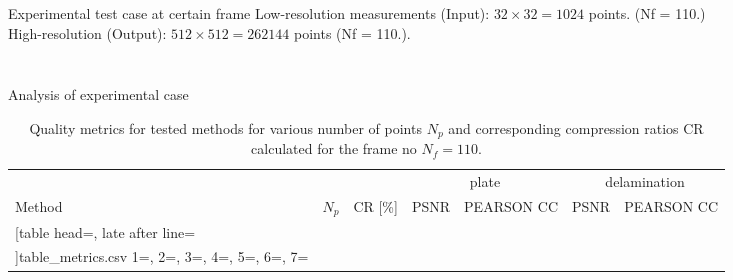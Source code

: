 \documentclass[10pt,aspectratio=169,dvipsnames]{beamer} %
\begin{document}
	\begin{frame}{Experimental test case at certain frame}
		Low-resolution measurements (Input): \(32\times32=1024\) points. (Nf = 110.)\\
		High-resolution (Output): \(512\times512=262144\) points (Nf = 110.).
		\begin{columns}[T]
			\begin{column}[c]{0.19\textwidth}
				\begin{figure}						
				\end{figure}
			\end{column}
			\begin{column}[c]{0.8\textwidth}
				\begin{figure}[ht!]
					\quad
					\quad
					\quad
					\quad
					\quad
					
					\quad
					\quad
					\quad
					\quad
					\quad
				\end{figure}
			\end{column}				
		\end{columns}
	\end{frame}
	\begin{frame}{Analysis of experimental case}
		\begin{table}[!ht]
			\renewcommand{\arraystretch}{1.3}
			\centering \footnotesize
			\caption{Quality metrics for tested methods for various number of points $N_p$ and corresponding compression ratios CR calculated for the frame no $N_f=110$.}	
			\begin{tabular}{lrrrcrc} 
				\toprule[1.5pt]
				& & & \multicolumn{2}{c}{plate} & \multicolumn{2}{c}{delamination} \\
				\cmidrule(lr){4-5} \cmidrule(lr){6-7}
				Method & $N_p$ & CR [\%] & PSNR & PEARSON CC& PSNR & PEARSON CC \\
				\midrule
				\csvreader
				[table head=\toprule,
				late after line=\\ 
				]{table_metrics.csv}{
					1=\one, 2=\two, 3=\three, 4=\four, 5=\five, 6=\six, 7=\seven
				}%
				{\one & \two & \three & \four & \five & \six & \seven }%
				\bottomrule[1.5pt]
			\end{tabular}	
			\label{tab:csv_results}
		\end{table}
	\end{frame}
\end{document}
